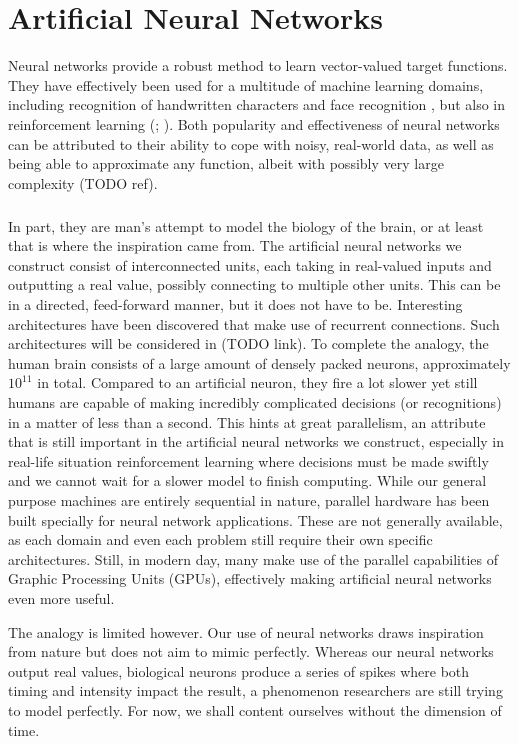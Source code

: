 \chapter{Artificial Neural Networks}
Neural networks provide a robust method to learn
vector-valued target functions.
They have effectively been used for a multitude of machine learning domains,
including recognition of handwritten characters
\parencite{LeCun1989}
and
face recognition
\parencite{Cottreil1991},
but also in reinforcement learning
(\cite{anderson1989}; \cite{lin1993}). %
Both popularity and effectiveness of neural networks can be attributed to
their ability to cope with noisy, real-world data,
as well as being able to approximate any function,
albeit with possibly very large complexity (TODO ref).
\paragraph{}
In part, they are man's attempt
to model the biology of the brain,
or at least that is where the inspiration came from.
The artificial neural networks we construct
consist of interconnected units,
each taking in real-valued inputs
and outputting a real value,
possibly connecting to multiple other units.
This can be in a directed, feed-forward manner,
but it does not have to be.
Interesting architectures have been discovered
that make use of recurrent connections.
Such architectures will be considered in (TODO link).
To complete the analogy,
the human brain consists of a large amount of densely packed neurons,
approximately $10^{11}$ in total.
Compared to an artificial neuron,
they fire a lot slower
yet still humans are capable of
making incredibly complicated decisions
(or recognitions)
in a matter of less than a second.
This hints at great parallelism,
an attribute that is still important
in the artificial neural networks we construct,
especially in real-life situation reinforcement learning
where decisions must be made swiftly and we cannot wait
for a slower model to finish computing.
While our general purpose machines 
are entirely sequential in nature,
parallel hardware has been built specially
for neural network applications.
These are not generally available,
as each domain and even each problem
still require their own specific architectures.
Still, in modern day, many make use
of the parallel capabilities of
Graphic Processing Units (GPUs),
effectively making artificial neural networks even more useful.

The analogy is limited however.
Our use of neural networks draws inspiration from nature
but does not aim to mimic perfectly.
Whereas our neural networks output real values,
biological neurons produce a series of spikes
where both timing and intensity impact the result, %
a phenomenon researchers are still trying to model perfectly.
For now,
we shall content ourselves without the dimension of time.

